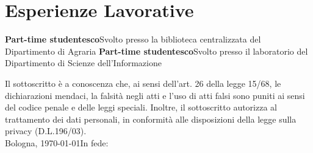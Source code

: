 \documentclass[10pt,a4paper]{moderncv}
\begin{document}
\section{Esperienze Lavorative}
 {\textbf{Part-time studentesco}\newline Svolto presso la biblioteca centralizzata del Dipartimento di Agraria}
 {\textbf{Part-time studentesco}\newline Svolto presso il laboratorio del Dipartimento di Scienze dell'Informazione}

%
%    

\vspace{\fill} 
{\footnotesize\noindent 
Il sottoscritto è a conoscenza che, ai sensi dell'art. 26 della legge 15/68, le dichiarazioni mendaci, la falsità negli atti e l'uso di atti falsi sono puniti ai sensi del codice penale e delle leggi speciali. Inoltre, il sottoscritto autorizza al trattamento dei dati personali, in conformità alle disposizioni della legge sulla privacy  (D.L.196/03).}
\vspace*{0.8cm}\\
Bologna, \today\hfill In fede: %
\makebox[9cm]{\dotfill}
\end{document}
